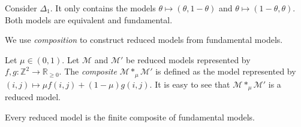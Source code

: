 \begin{example}\label{ex:prob-simplex-1}
    Consider \( \Delta_1 \). It only contains the models \( \theta \mapsto (\theta, 1-\theta) \) and \( \theta \mapsto (1-\theta, \theta) \). Both models are equivalent and fundamental.
\end{example}

We use \emph{composition} to construct reduced models from fundamental models.

\begin{definition}
    Let \( \mu \in (0,1) \). Let \( \mathcal{M} \) and \( \mathcal{M}' \) be reduced models represented by \( f,g : \mathbb{Z}^2 \to \mathbb{R}_{\geq 0} \). The \emph{composite} \( \mathcal{M} *_\mu \mathcal{M}' \) is defined as the model represented by \(  (i,j) \mapsto \mu f(i,j) + (1-\mu) g(i,j) \). It is easy to see that \( \mathcal{M} *_\mu \mathcal{M}' \) is a reduced model.
\end{definition}






\begin{proposition}\label{prop:composition-fundamental}
    Every reduced model is the finite composite of fundamental models.
\end{proposition}

